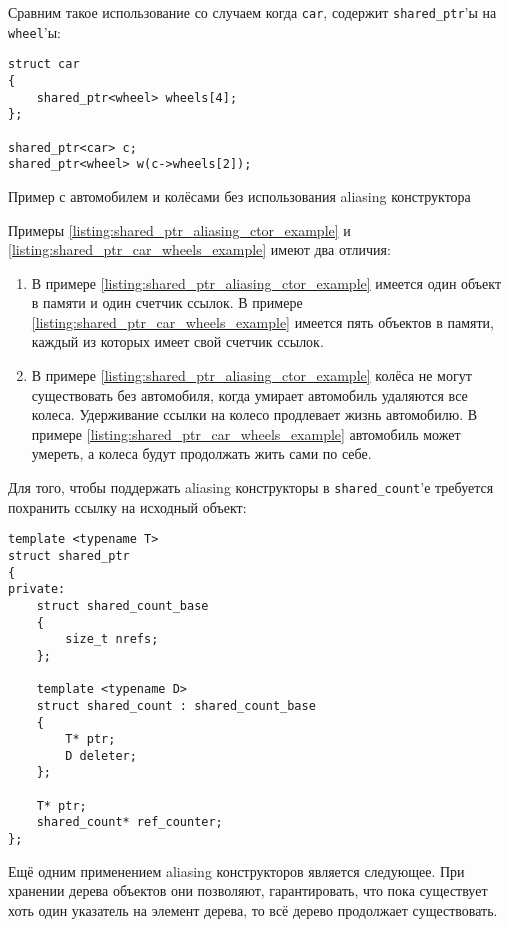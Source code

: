 Сравним такое использование со случаем когда \texttt{car}, содержит \texttt{shared_ptr}'ы на \texttt{wheel}'ы:

\begin{listing}
\begin{verbatim}
struct car
{
    shared_ptr<wheel> wheels[4];
};

shared_ptr<car> c;
shared_ptr<wheel> w(c->wheels[2]);
\end{verbatim}
\caption{Пример с автомобилем и колёсами без использования aliasing конструктора}
\label{listing:shared_ptr_car_wheels_example}
\end{listing}

Примеры \ref{listing:shared_ptr_aliasing_ctor_example} и \ref{listing:shared_ptr_car_wheels_example} имеют два отличия:
\begin{enumerate}
\item В примере \ref{listing:shared_ptr_aliasing_ctor_example} имеется один объект в памяти и один счетчик ссылок. В примере \ref{listing:shared_ptr_car_wheels_example} имеется пять объектов в памяти, каждый из которых имеет свой счетчик ссылок.
\item В примере \ref{listing:shared_ptr_aliasing_ctor_example} колёса не могут существовать без автомобиля, когда умирает автомобиль удаляются все колеса. Удерживание ссылки на колесо продлевает жизнь автомобилю. В примере \ref{listing:shared_ptr_car_wheels_example} автомобиль может умереть, а колеса будут продолжать жить сами по себе.
\end{enumerate}

Для того, чтобы поддержать aliasing конструкторы в \texttt{shared_count}'е требуется похранить ссылку на исходный объект:

\begin{verbatim}
template <typename T>
struct shared_ptr
{
private:
    struct shared_count_base
    {
        size_t nrefs;
    };

    template <typename D>
    struct shared_count : shared_count_base
    {
        T* ptr;
        D deleter;
    };

    T* ptr;
    shared_count* ref_counter;
};
\end{verbatim}

Ещё одним применением aliasing конструкторов является следующее. При хранении дерева объектов они позволяют, гарантировать, что пока существует хоть один указатель на элемент дерева, то всё дерево продолжает существовать.


